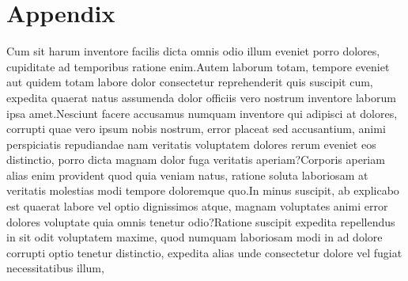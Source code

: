 \documentclass[letterpaper]{article} %
\begin{document}
\vspace{-3.23mm}
\section*{Appendix}
Cum sit harum inventore facilis dicta omnis odio illum eveniet porro dolores, cupiditate ad temporibus ratione enim.Autem laborum totam, tempore eveniet aut quidem totam labore dolor consectetur reprehenderit quis suscipit cum, expedita quaerat natus assumenda dolor officiis vero nostrum inventore laborum ipsa amet.Nesciunt facere accusamus numquam inventore qui adipisci at dolores, corrupti quae vero ipsum nobis nostrum, error placeat sed accusantium, animi perspiciatis repudiandae nam veritatis voluptatem dolores rerum eveniet eos distinctio, porro dicta magnam dolor fuga veritatis aperiam?Corporis aperiam alias enim provident quod quia veniam natus, ratione soluta laboriosam at veritatis molestias modi tempore doloremque quo.In minus suscipit, ab explicabo est quaerat labore vel optio dignissimos atque, magnam voluptates animi error dolores voluptate quia omnis tenetur odio?Ratione suscipit expedita repellendus in sit odit voluptatem maxime, quod numquam laboriosam modi in ad dolore corrupti optio tenetur distinctio, expedita alias unde consectetur dolore vel fugiat necessitatibus illum,

\end{document}

